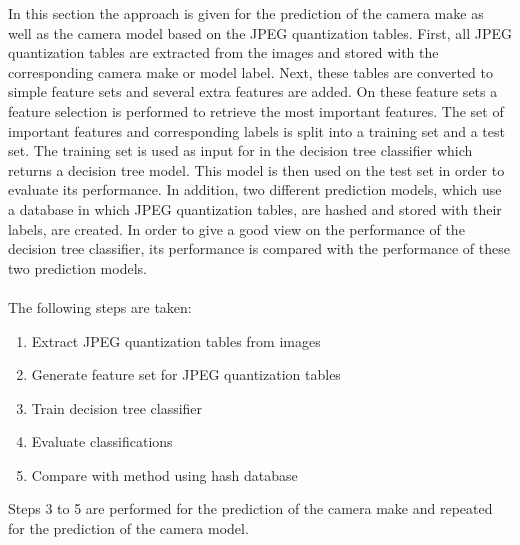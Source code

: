 In this section the approach is given for the prediction of the camera make as well as the camera model based on the JPEG quantization tables.
First, all JPEG quantization tables are extracted from the images and stored with the corresponding camera make or model label. Next, these tables are converted to simple feature sets and several extra features are added. On these feature sets a feature selection is performed to retrieve the most important features. The set of important features and corresponding labels is split into a training set and a test set. The training set is used as input for in the decision tree classifier which returns a decision tree model. This model is then used on the test set in order to evaluate its performance. In addition, two different prediction models, which use a database in which JPEG quantization tables, are hashed and stored with their labels, are created. In order to give a good view on the performance of the decision tree classifier, its performance is compared with the performance of these two prediction models.
\\~\\
The following steps are taken:
\begin{enumerate}
\item Extract JPEG quantization tables from images
\item Generate feature set for JPEG quantization tables
\item Train decision tree classifier 
\item Evaluate classifications
\item Compare with method using hash database
\end{enumerate}
Steps 3 to 5 are performed for the prediction of the camera make and repeated for the prediction of the camera model.

